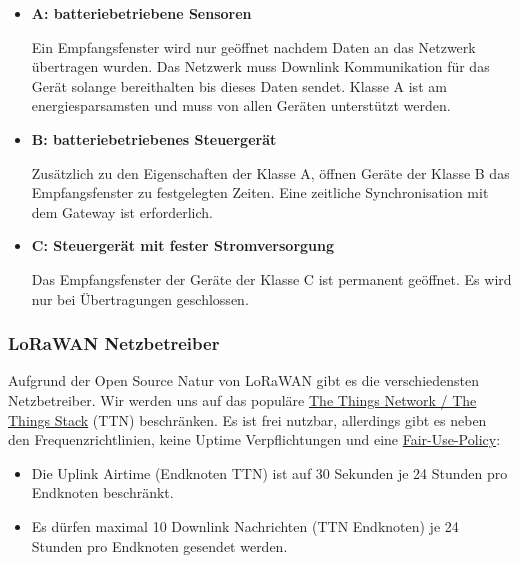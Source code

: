 \documentclass[12pt]{article}
\begin{document}
        \begin{itemize}
          \item \textbf{A: batteriebetriebene Sensoren}
          
          Ein Empfangsfenster wird nur geöffnet nachdem Daten an das Netzwerk übertragen wurden. Das Netzwerk muss Downlink Kommunikation
          für das Gerät solange bereithalten bis dieses Daten sendet. Klasse A ist am energiesparsamsten und muss von allen Geräten unterstützt werden.
          
          \item \textbf{B: batteriebetriebenes Steuergerät}
          
          Zusätzlich zu den Eigenschaften der Klasse A, öffnen Geräte der Klasse B das Empfangsfenster zu festgelegten Zeiten. Eine zeitliche Synchronisation mit dem Gateway ist erforderlich.
          
          \item \textbf{C: Steuergerät mit fester Stromversorgung}
          
          Das Empfangsfenster der Geräte der Klasse C ist permanent geöffnet. Es wird nur bei Übertragungen geschlossen.
        \end{itemize}

      

      \subsubsection{LoRaWAN Netzbetreiber} \label{subsec:LoRaWAN Netzbetreiber}
        Aufgrund der Open Source Natur von LoRaWAN gibt es die verschiedensten Netzbetreiber. Wir werden uns auf das populäre
        \href{https://www.thethingsnetwork.org/}{The Things Network / The Things Stack} (TTN) beschränken.
        Es ist frei nutzbar, allerdings gibt es neben den Frequenzrichtlinien, keine Uptime Verpflichtungen und eine \href{https://www.thethingsnetwork.org/docs/lorawan/duty-cycle/}{Fair-Use-Policy}:

        \begin{itemize}
          \item Die Uplink Airtime (Endknoten \textrightarrow{} TTN) ist auf 30 Sekunden je 24 Stunden pro Endknoten beschränkt.
          \item Es dürfen maximal 10 Downlink Nachrichten (TTN \textrightarrow{} Endknoten) je 24 Stunden pro Endknoten gesendet werden.
        \end{itemize}
        
\end{document}
